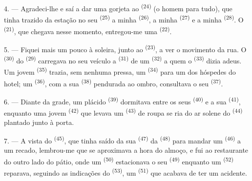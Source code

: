 4. --- Agradeci-lhe e saí a dar uma gorjeta ao 
\textsuperscript{(24)} (o homem para tudo), que tinha trazido da estação no seu
 \textsuperscript{(25)} a minha 
\textsuperscript{(26)}, a minha  \textsuperscript{(27)} e a minha
 \textsuperscript{(28)}. O 
\textsuperscript{(21)}, que chegava nesse momento, entregou-me uma 
\textsuperscript{(22)}.

5. --- Fiquei mais um pouco à soleira, junto ao 
\textsuperscript{(23)}, a ver o movimento da rua. O 
\textsuperscript{(30)} do  \textsuperscript{(29)} carregava no seu
veículo a  \textsuperscript{(31)} de um 
\textsuperscript{(32)} a quem o  \textsuperscript{(33)} dizia adeus. Um
jovem  \textsuperscript{(35)} trazia, sem nenhuma pressa, um
 \textsuperscript{(34)} para um dos hóspedes do hotel; um
 \textsuperscript{(36)}, com a sua 
\textsuperscript{(38)} pendurada ao ombro, consultava o seu 
\textsuperscript{(37)}.

\VUsaut{4.0mm}
\VUsaut{3.0mm}

6. --- Diante da grade, um plácido 
\textsuperscript{(39)} dormitava entre os seus 
\textsuperscript{(40)} e a sua  \textsuperscript{(41)},
enquanto uma jovem  \textsuperscript{(42)} que levava um
 \textsuperscript{(43)} de roupa se ria do ar solene do
 \textsuperscript{(44)} plantado junto à porta.

7. --- A vista do  \textsuperscript{(45)}, que tinha saído da
sua  \textsuperscript{(47)} da  \textsuperscript{(48)} para
mandar um  \textsuperscript{(46)} a um recado,
lembrou-me que se aproximava a hora do almoço, e fui ao restaurante do
outro lado do pátio, onde um  \textsuperscript{(50)}
estacionava o seu  \textsuperscript{(49)} enquanto um
 \textsuperscript{(52)} reparava, seguindo as indicações do
 \textsuperscript{(53)}, um 
\textsuperscript{(51)} que acabava de ter um acidente.

